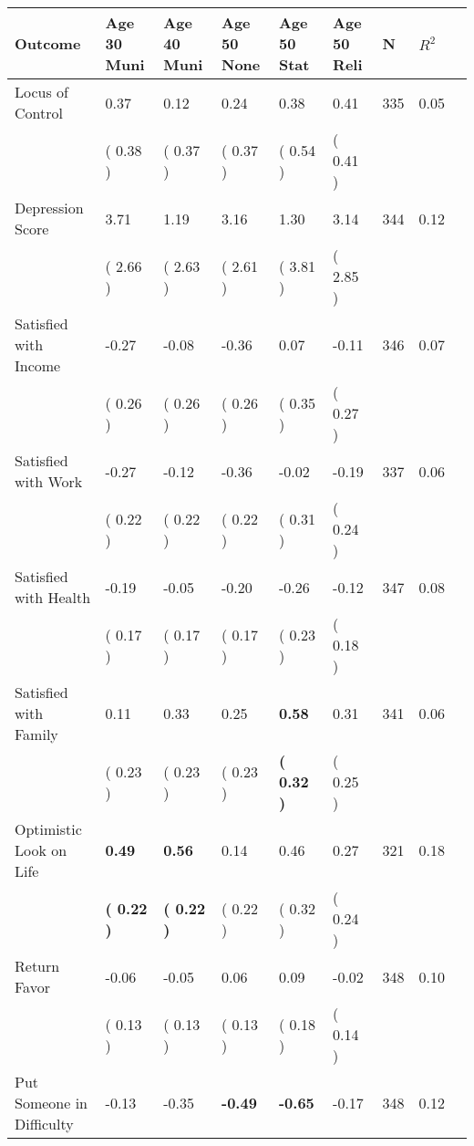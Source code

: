 \begin{tabular}{L{6.2cm} C{1.8cm} C{1.8cm} C{1.8cm} C{1.8cm} C{1.8cm} C{1.8cm} C{0.3cm} C{0.3cm}}
\toprule
 \textbf{Outcome} & \textbf{Age 30 Muni} & \textbf{Age 40 Muni} & \textbf{Age 50 None} & \textbf{Age 50 Stat} & \textbf{Age 50 Reli} & \textbf{N} & \textbf{$ R^2$} \\
\midrule
Locus of Control &      0.37 &      0.12 &      0.24 &      0.38 &      0.41  & 335 &       0.05 \\ 
 & (     0.38 ) & (     0.37 ) & (     0.37 ) & (     0.54 ) & (     0.41 )  & \\
Depression Score &      3.71 &      1.19 &      3.16 &      1.30 &      3.14  & 344 &       0.12 \\ 
 & (     2.66 ) & (     2.63 ) & (     2.61 ) & (     3.81 ) & (     2.85 )  & \\
Satisfied with Income &     -0.27 &     -0.08 &     -0.36 &      0.07 &     -0.11  & 346 &       0.07 \\ 
 & (     0.26 ) & (     0.26 ) & (     0.26 ) & (     0.35 ) & (     0.27 )  & \\
Satisfied with Work &     -0.27 &     -0.12 &     -0.36 &     -0.02 &     -0.19  & 337 &       0.06 \\ 
 & (     0.22 ) & (     0.22 ) & (     0.22 ) & (     0.31 ) & (     0.24 )  & \\
Satisfied with Health &     -0.19 &     -0.05 &     -0.20 &     -0.26 &     -0.12  & 347 &       0.08 \\ 
 & (     0.17 ) & (     0.17 ) & (     0.17 ) & (     0.23 ) & (     0.18 )  & \\
Satisfied with Family &      0.11 &      0.33 &      0.25 & \textbf{     0.58} &      0.31  & 341 &       0.06 \\ 
 & (     0.23 ) & (     0.23 ) & (     0.23 ) & \textbf{(     0.32 )} & (     0.25 )  & \\
Optimistic Look on Life & \textbf{     0.49} & \textbf{     0.56} &      0.14 &      0.46 &      0.27  & 321 &       0.18 \\ 
 & \textbf{(     0.22 )} & \textbf{(     0.22 )} & (     0.22 ) & (     0.32 ) & (     0.24 )  & \\
Return Favor &     -0.06 &     -0.05 &      0.06 &      0.09 &     -0.02  & 348 &       0.10 \\ 
 & (     0.13 ) & (     0.13 ) & (     0.13 ) & (     0.18 ) & (     0.14 )  & \\
Put Someone in Difficulty &     -0.13 &     -0.35 & \textbf{    -0.49} & \textbf{    -0.65} &     -0.17  & 348 &       0.12 \\ 

\end{tabular}
